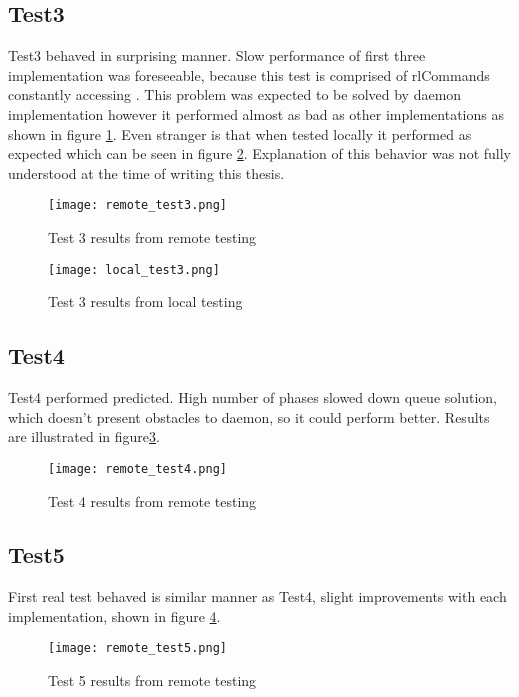 \subsection{Test3}
Test3 behaved in surprising manner. Slow performance of first three implementation was foreseeable, because this test is comprised of rlCommands constantly accessing . This problem was expected to be solved by daemon implementation however it performed almost as bad as other implementations as shown in figure \ref{fig:remote_test3}. Even stranger is that when tested locally it performed as expected which can be seen in figure \ref{fig:local_test3}. Explanation of this behavior was not fully understood at the time of writing this thesis. 

\begin{figure}
  \texttt{[image: remote\_test3.png]}
  \caption{Test 3 results from remote testing}
  \label{fig:remote_test3}
\end{figure}

\begin{figure}
  \texttt{[image: local\_test3.png]}
  \caption{Test 3 results from local testing}
  \label{fig:local_test3}
\end{figure}

\subsection{Test4}
Test4 performed predicted. High number of phases slowed down queue solution, which doesn't present obstacles to daemon, so it could perform better. Results are illustrated in figure\ref{fig:remote_test4}.

\begin{figure}
  \texttt{[image: remote\_test4.png]}
  \caption{Test 4 results from remote testing}
  \label{fig:remote_test4}
\end{figure}

\subsection{Test5}
First real test behaved is similar manner as Test4, slight improvements with each implementation, shown in figure \ref{fig:remote_test5}.

\begin{figure}
  \texttt{[image: remote\_test5.png]}
  \caption{Test 5 results from remote testing}
  \label{fig:remote_test5}
\end{figure}


